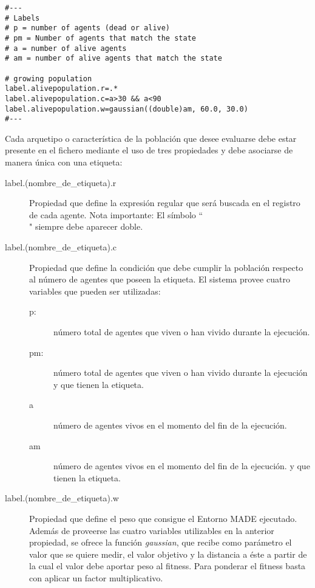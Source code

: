 \begin{verbatim}
#---
# Labels
# p = number of agents (dead or alive)
# pm = Number of agents that match the state
# a = number of alive agents
# am = number of alive agents that match the state

# growing population
label.alivepopulation.r=.*
label.alivepopulation.c=a>30 && a<90
label.alivepopulation.w=gaussian((double)am, 60.0, 30.0)
#---
\end{verbatim}

Cada arquetipo o característica de la población que desee evaluarse debe estar
presente en el fichero mediante el uso de tres propiedades y debe asociarse de
manera única con una etiqueta:

\begin{description}
 \item[label.(nombre\_de\_etiqueta).r] Propiedad que define la expresión regular
que será buscada en el registro de cada agente. Nota importante: El símbolo
``\\" siempre debe aparecer doble.
 \item[label.(nombre\_de\_etiqueta).c] Propiedad que define la condición
que debe cumplir la población respecto al número de agentes que poseen la
etiqueta. El sistema provee cuatro variables que pueden ser utilizadas:
\begin{description}
 \item[p:] número total de agentes que viven o han vivido durante la ejecución.
 \item[pm:]  número total de agentes que viven o han vivido durante la
ejecución y que tienen la etiqueta.
 \item[a] número de agentes vivos en el momento del fin de la ejecución.
 \item[am] número de agentes  vivos en el momento del fin de la ejecución. y
que tienen la etiqueta.
\end{description}
 \item[label.(nombre\_de\_etiqueta).w] Propiedad que define el peso que consigue
el Entorno MADE ejecutado. Además de proveerse las cuatro variables utilizables
en la anterior propiedad, se ofrece la función \textit{gaussian}, que recibe
como parámetro el valor que se quiere medir, el valor objetivo y la distancia a
éste a partir de la cual el valor debe aportar peso al fitness. Para ponderar
el fitness basta con aplicar un factor multiplicativo.
\end{description}






